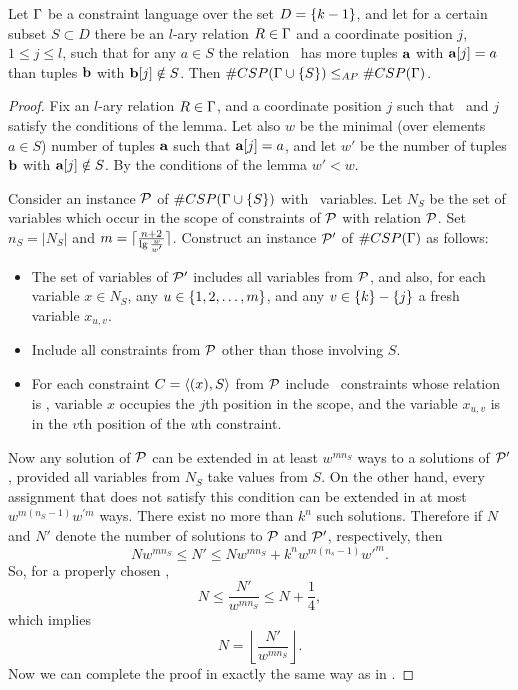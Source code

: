 \begin{lemma}\label{lem:pinning}
Let \(\Gamma\) be a constraint language over the set \(D=\{k-1\}\)\@,
and let for a certain subset \(S \subset D\) 
there be an \(l\)-ary relation \(R \in \Gamma\) and a coordinate position \(j\),
\(1 \le j \le l\), such that for any \(a\in S\) the relation \mR\ has more tuples
\(\textbf{a}\) with \(\textbf{a}[j]=a\) than tuples \(\textbf{b}\) with
\(\textbf{b}[j] \notin S\)\@. Then \(\#CSP(\Gamma \cup \{S\}) \le_{AP} \#CSP(\Gamma)\)\@.
\end{lemma}

\begin{proof}
Fix an \(l\)-ary relation \(R \in \Gamma\)\@, and 
a coordinate position \(j\) such that \mR\ and \(j\) satisfy the conditions of the lemma.
Let also \(w\) be the minimal (over elements \(a\in S\)) number of tuples \(\textbf{a}\)
such that \(\textbf{a}[j]=a\), and let \(w'\) be the number of tuples \(\textbf{b}\) with
\(\textbf{a}[j] \notin S\). By the conditions of the lemma \(w'<w\)\@.

Consider an instance \(\mathcal{P}\) of \(\#CSP(\Gamma \cup \{S\})\)
with \mn\ variables. Let \(N_S\) be the set of
variables which occur in the scope of constraints of \(\mathcal{P}\) with relation \(\mathcal{P}\)\@. 
Set \(n_S = |N_S|\) and \(m = \lceil\frac{n+2}{\lg{\frac{w}{w'}}}\rceil\)\@.
Construct an instance \(\mathcal{P}'\) of \(\#CSP(\Gamma)\) as follows:
\begin{itemize}
\item
The set of variables of \(\mathcal{P}'\) includes all variables from \(\mathcal{P}\),
and also, for each variable \(x \in N_S\), any \(u \in \{{1,2,\dotsc,m}\}\), and any
\(v\in\{k\}-\{j\}\) a fresh variable \(x_{u,v}\)\@. 
\item 
Include all constraints from \(\mathcal{P}\) other than those involving \(S\)\@. 
\item
For each constraint \(C=\langle (x),S \rangle\) from \(\mathcal{P}\) include \mm\ constraints whose
relation is \mR, variable \(x\) occupies the \(j\)th position in the scope,
and the variable \(x_{u,v}\) is in the \(v\)th position of the \(u\)th constraint.
\end{itemize}

Now any solution of \(\mathcal{P}\) can be extended in at least \(w^{mn_S}\) 
ways to a solutions of \(\mathcal{P}'\)\@, provided all variables from \(N_S\)
take values from \(S\)\@. On the other hand, every assignment that does not satisfy this
condition can be extended in at most \(w^{m(n_S-1)}w^{\prime m}\) ways.
There exist no more than \(k^n\) such solutions. Therefore if \(N\) and \(N'\)
denote the number of solutions to \(\mathcal{P}\) and \(\mathcal{P}'\), respectively, then
\[Nw^{mn_S} \le N' \le Nw^{mn_S} + k^nw^{m(n_s-1)}w'^m.\]
So, for a properly chosen \mm, 
\[N \le \frac{N'}{w^{mn_S}} \le N + \frac{1}{4},\]
which implies
\[N = \left\lfloor \frac{N'}{w^{mn_S}} \right\rfloor.\]
Now we can complete the proof in exactly the same way as in \cite{Trichotomy}.
\end{proof}

